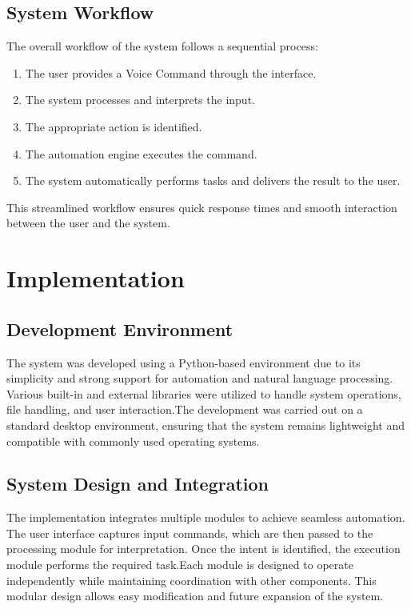 \documentclass[conference]{IEEEtran}
\begin{document}
\subsection{System Workflow}
\noindent
The overall workflow of the system follows a sequential process:
\begin{enumerate}
    \item The user provides a Voice Command through the interface.
    \item The system processes and interprets the input.
    \item The appropriate action is identified.
    \item The automation engine executes the command.
    \item The system automatically performs tasks and delivers the result to the user.
\end{enumerate}
This streamlined workflow ensures quick response times and smooth interaction between the user and the system.




\section{\large Implementation}

\subsection{Development Environment}
\noindent
The system was developed using a Python-based environment due to its simplicity and strong support for automation and natural language processing. Various built-in and external libraries were utilized to handle system operations, file handling, and user interaction.The development was carried out on a standard desktop environment, ensuring that the system remains lightweight and compatible with commonly used operating systems.

\subsection{System Design and Integration}
\noindent
The implementation integrates multiple modules to achieve seamless automation. The user interface captures input commands, which are then passed to the processing module for interpretation. Once the intent is identified, the execution module performs the required task.Each module is designed to operate independently while maintaining coordination with other components. This modular design allows easy modification and future expansion of the system.
\end{document}
